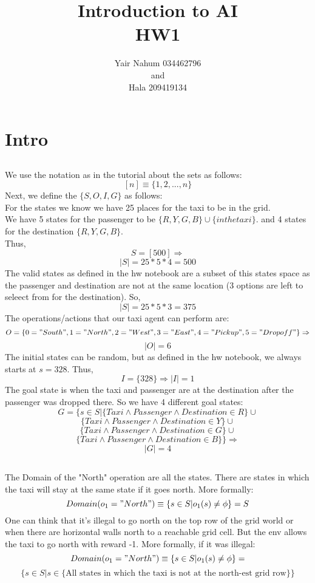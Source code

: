 \documentclass[12pt]{article}
\title{Introduction to AI\\HW1}
\author{Yair Nahum 034462796\\and\\Hala 209419134 }
\begin{document}
\maketitle


\section{Intro}

\subsection{}
We use the notation as in the tutorial about the sets as follows:\\
$$[n] \equiv \{ 1,2,...,n\}$$
Next, we define the $\{S,O,I,G\}$ as follows:\\
For the states we know we have 25 places for the taxi to be in the grid.\\
We have 5 states for the passenger to be $\{R,Y,G,B\}\cup\{in the taxi\}$.
and 4 states for the destination $\{R,Y,G,B\}$.\\
Thus, 
$$S = [500] \Rightarrow $$
$$ |S| = 25*5*4 = 500$$
The valid states as defined in the hw notebook are a subset of this states space as the passenger and destination are not at the same location (3 options are left to seleect from for the destination). So,\\
$$ |S| = 25*5*3 = 375$$
The operations/actions that our taxi agent can perform are:\\
$$O = \{0="South",1="North",2="West",3="East",4="Pickup",5="Dropoff"\}\Rightarrow$$
$$|O| = 6$$
The initial states can be random, but as defined in the hw notebook, we always starts at $s = 328$. Thus,\\
$$I=\{328\}\Rightarrow |I|=1$$
The goal state is when the taxi and passenger are at the destination after the passenger was dropped there. So we have 4 different goal states:\\

$$G=\{s\in S | \{Taxi\wedge Passenger \wedge Destination\in R\} \cup $$
$$\{Taxi\wedge Passenger \wedge Destination\in Y\} \cup $$
$$\{Taxi\wedge Passenger \wedge Destination\in G\} \cup $$
$$\{Taxi\wedge Passenger \wedge Destination\in B\} \} \Rightarrow$$
$$|G|=4$$
\subsection{}
The Domain of the "North" operation are all the states. There are states in which the taxi will stay at the same state if it goes north.
More formally:
$$Domain(o_1="North")\equiv\{s\in S | o_1(s)\neq \phi\} = S$$
One can think that it's illegal to go north on the top row of the grid world or when  there are horizontal walls north to a reachable grid cell. But the env allows the taxi to go north with reward -1.
More formally, if it was illegal:\\
$$Domain(o_1="North")\equiv\{s\in S | o_1(s)\neq \phi\} = $$
$$\{s\in S |s\in \{\text{All states in which the taxi is not at the north-est grid row} \}\}$$
\end{document}
